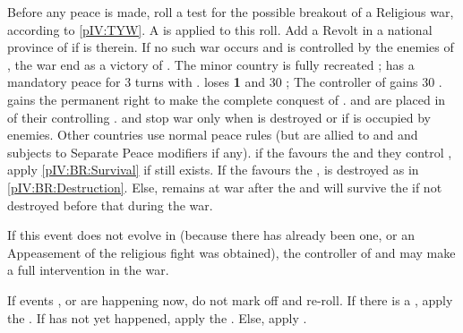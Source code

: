 \phpaix
\aparag Before any peace is made, roll a test for the possible breakout of a
Religious war, according to \ref{pIV:TYW}.  A  is applied to this
roll.
\aparag Add a Revolt \facemoins in a national province of \payshongrie if
\leaderBethlen is therein.
\label{pIV:BR:Survival} If no such war occurs
and \villeVienne is controlled by the enemies of \HAB, the war end as a
victory of \paysBoheme.  The minor country is fully recreated ; \HAB has a
mandatory peace for 3 turns with \paysBoheme. \HAB loses {\bf 1} \STAB and 30
\PV ; The controller of \paysBoheme gains 30 \PV. \HAB gains the permanent
right to make the complete conquest of \paysBoheme.  \paysBoheme and
\paysPalatinat are placed in \AM of their controlling \MAJ.
\aparag \HAB and \paysBoheme stop war only when \paysBoheme is destroyed or if
\villeVienne is occupied by enemies.  Other countries use normal peace rules
(but are allied to \HAB and \paysBoheme and subjects to Separate Peace
modifiers if any).
\bparag if the  favours the \alliance and they
control \villeVienne, apply \ref{pIV:BR:Survival} if \paysBoheme still exists.
\bparag If the  favours the \ligue, \paysBoheme
is destroyed as in \ref{pIV:BR:Destruction}.
\bparag Else, \paysBoheme remains at war after the  and will survive the  if not
destroyed before that during the war.


\phdipl
\aparag If this event does not evolve in  (because there has
already been one, or an Appeasement of the religious fight was obtained), the
controller of \paysBoheme and \paysPalatinat may make a full intervention in
the war.





\aparag If events ,  or
 are happening now, do not mark off and re-roll.
\aparag If there is a \GE, apply the .
\aparag If  has not yet happened, apply the
.
\aparag Else, apply .



